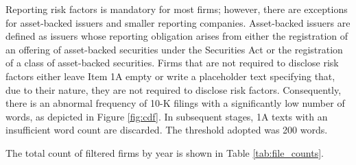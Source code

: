 \documentclass[12pt, letterpaper]{article}
\begin{document}
Reporting risk factors is mandatory for most firms; however, there are exceptions for asset-backed issuers and smaller reporting companies. Asset-backed issuers are defined as issuers whose reporting obligation arises from either the registration of an offering of asset-backed securities under the Securities Act or the registration of a class of asset-backed securities. Firms that are not required to disclose risk factors either leave Item 1A empty or write a placeholder text specifying that, due to their nature, they are not required to disclose risk factors. Consequently, there is an abnormal frequency of 10-K filings with a significantly low number of words, as depicted in Figure \ref{fig:cdf}. In subsequent stages, 1A texts with an insufficient word count are discarded. The threshold adopted was 200 words. 

The total count of filtered firms by year is shown in Table \ref{tab:file_counts}.

\end{document}
